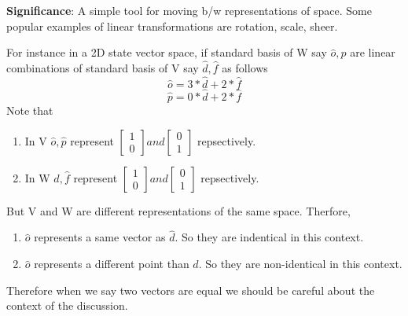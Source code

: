 \documentclass[../main.tex]{subfiles}
\begin{document}
{\color{magenta} \textbf{Significance}:
A simple tool for moving b/w representations of space.
Some popular examples of linear transformations are rotation, scale, sheer.

For instance in a 2D state vector space, if standard basis of W say $ \hat{o}, \hat{p} $ are linear combinations of standard basis of V say $ \hat{d}, \hat{f} $ as follows
\[  \hat{o} = 3 * \hat{d} + 2 * \hat{f} \]
\[  \hat{p} = 0 * \hat{d} + 2 * \hat{f} \]
Note that
\begin{enumerate}[nolistsep]
  \item In V $ \hat{o}, \hat{p} $ represent $ \begin{bmatrix} 1 \\ 0 \end{bmatrix} and \begin{bmatrix} 0 \\ 1 \end{bmatrix} $ repsectively.
  \item In W $ \hat{d}, \hat{f} $ represent $ \begin{bmatrix} 1 \\ 0 \end{bmatrix} and \begin{bmatrix} 0 \\ 1 \end{bmatrix} $ repsectively.
\end{enumerate}
But V and W are different representations of the same space. Therfore,
\begin{enumerate}[nolistsep]
  \item $ \hat{o} $ represents a same vector as $ \hat{d} $. So they are indentical in this context.
  \item $ \hat{o} $ represents a different point than $ \hat{d} $. So they are non-identical in this context.
\end{enumerate}
Therefore when we say two vectors are equal we should be careful about the context of the discussion.

}
\end{document}

